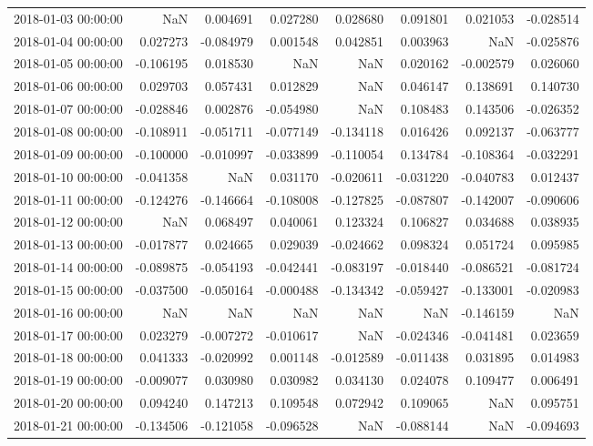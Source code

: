 \begin{tabular}{lrrrrrrr}
2018-01-03 00:00:00 & NaN & 0.004691 & 0.027280 & 0.028680 & 0.091801 & 0.021053 & -0.028514 \\
2018-01-04 00:00:00 & 0.027273 & -0.084979 & 0.001548 & 0.042851 & 0.003963 & NaN & -0.025876 \\
2018-01-05 00:00:00 & -0.106195 & 0.018530 & NaN & NaN & 0.020162 & -0.002579 & 0.026060 \\
2018-01-06 00:00:00 & 0.029703 & 0.057431 & 0.012829 & NaN & 0.046147 & 0.138691 & 0.140730 \\
2018-01-07 00:00:00 & -0.028846 & 0.002876 & -0.054980 & NaN & 0.108483 & 0.143506 & -0.026352 \\
2018-01-08 00:00:00 & -0.108911 & -0.051711 & -0.077149 & -0.134118 & 0.016426 & 0.092137 & -0.063777 \\
2018-01-09 00:00:00 & -0.100000 & -0.010997 & -0.033899 & -0.110054 & 0.134784 & -0.108364 & -0.032291 \\
2018-01-10 00:00:00 & -0.041358 & NaN & 0.031170 & -0.020611 & -0.031220 & -0.040783 & 0.012437 \\
2018-01-11 00:00:00 & -0.124276 & -0.146664 & -0.108008 & -0.127825 & -0.087807 & -0.142007 & -0.090606 \\
2018-01-12 00:00:00 & NaN & 0.068497 & 0.040061 & 0.123324 & 0.106827 & 0.034688 & 0.038935 \\
2018-01-13 00:00:00 & -0.017877 & 0.024665 & 0.029039 & -0.024662 & 0.098324 & 0.051724 & 0.095985 \\
2018-01-14 00:00:00 & -0.089875 & -0.054193 & -0.042441 & -0.083197 & -0.018440 & -0.086521 & -0.081724 \\
2018-01-15 00:00:00 & -0.037500 & -0.050164 & -0.000488 & -0.134342 & -0.059427 & -0.133001 & -0.020983 \\
2018-01-16 00:00:00 & NaN & NaN & NaN & NaN & NaN & -0.146159 & NaN \\
2018-01-17 00:00:00 & 0.023279 & -0.007272 & -0.010617 & NaN & -0.024346 & -0.041481 & 0.023659 \\
2018-01-18 00:00:00 & 0.041333 & -0.020992 & 0.001148 & -0.012589 & -0.011438 & 0.031895 & 0.014983 \\
2018-01-19 00:00:00 & -0.009077 & 0.030980 & 0.030982 & 0.034130 & 0.024078 & 0.109477 & 0.006491 \\
2018-01-20 00:00:00 & 0.094240 & 0.147213 & 0.109548 & 0.072942 & 0.109065 & NaN & 0.095751 \\
2018-01-21 00:00:00 & -0.134506 & -0.121058 & -0.096528 & NaN & -0.088144 & NaN & -0.094693 \\

\end{tabular}
